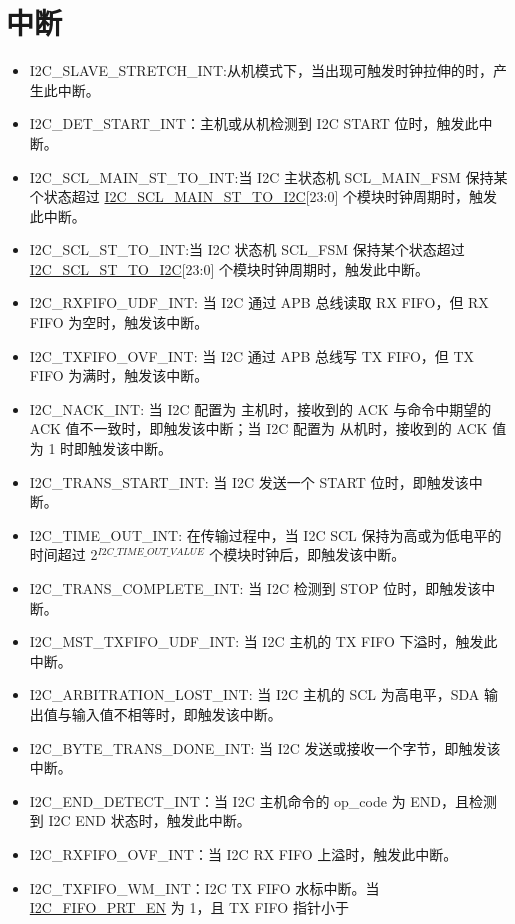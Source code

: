\documentclass[main\_\_CN.tex]{subfiles}
\begin{document}
\section{中断}\label{sub:i2c-int}
\begin{itemize}
\item \label{int:i2c-slave-stretch}I2C\_SLAVE\_STRETCH\_INT:从机模式下，当出现可触发时钟拉伸的时，产生此中断。
\item \label{int:i2c-start}I2C\_DET\_START\_INT：主机或从机检测到 I2C START 位时，触发此中断。
\item \label{int:i2c-scl-main-fsm}I2C\_SCL\_MAIN\_ST\_TO\_INT:当 I2C 主状态机 SCL\_MAIN\_FSM 保持某个状态超过 \hyperref[fielddesc:I2CSCLMAINSTTOI2C]{I2C\_SCL\_MAIN\_ST\_TO\_I2C}[23:0] 个模块时钟周期时，触发此中断。
\item \label{int:i2c-scl-fsm}I2C\_SCL\_ST\_TO\_INT:当 I2C 状态机 SCL\_FSM 保持某个状态超过 \hyperref[fielddesc:I2CSCLSTTOI2C]{I2C\_SCL\_ST\_TO\_I2C}[23:0] 个模块时钟周期时，触发此中断。
\item \label{int:i2c-rxfifo-udf}I2C\_RXFIFO\_UDF\_INT: 当 I2C 通过 APB 总线读取 RX FIFO，但 RX FIFO 为空时，触发该中断。
\item \label{int:i2c-txfifo-ovf}I2C\_TXFIFO\_OVF\_INT: 当 I2C 通过 APB 总线写 TX FIFO，但 TX FIFO 为满时，触发该中断。
\item \label{int:i2c-nack}I2C\_NACK\_INT: 当 I2C 配置为 主机时，接收到的 ACK 与命令中期望的 ACK 值不一致时，即触发该中断；当 I2C 配置为 从机时，接收到的 ACK 值为 1 时即触发该中断。
\item \label{int:i2c-trans-start}I2C\_TRANS\_START\_INT: 当 I2C 发送一个 START 位时，即触发该中断。
\item \label{int:i2c-time-out}I2C\_TIME\_OUT\_INT: 在传输过程中，当 I2C SCL 保持为高或为低电平的时间超过 2$^{\hyperref[fielddesc:I2CTIMEOUTVALUE]{I2C\_TIME\_OUT\_VALUE}}$ 个模块时钟后，即触发该中断。
\item \label{int:i2c-trans-complete}I2C\_TRANS\_COMPLETE\_INT: 当 I2C 检测到 STOP 位时，即触发该中断。
\item \label{int:i2c-mst-txfifo-udf}I2C\_MST\_TXFIFO\_UDF\_INT: 当 I2C 主机的 TX FIFO 下溢时，触发此中断。
\item \label{int:i2c-arbitration-lost}I2C\_ARBITRATION\_LOST\_INT: 当 I2C 主机的 SCL 为高电平，SDA 输出值与输入值不相等时，即触发该中断。
\item \label{int:i2c-byte-trans-done}I2C\_BYTE\_TRANS\_DONE\_INT: 当 I2C 发送或接收一个字节，即触发该中断。
\item \label{int:i2c-end}I2C\_END\_DETECT\_INT：当 I2C 主机命令的 op\_code 为 END，且检测到 I2C END 状态时，触发此中断。
\item \label{int:i2c-rxfifo-ovf}I2C\_RXFIFO\_OVF\_INT：当 I2C RX FIFO 上溢时，触发此中断。
\item \label{int:i2c-txfifo-wm}I2C\_TXFIFO\_WM\_INT：I2C TX FIFO 水标中断。当 \hyperref[fielddesc:I2CFIFOPRTEN]{I2C\_FIFO\_PRT\_EN} 为 1，且 TX FIFO 指针小于


\end{itemize}
\end{document}
